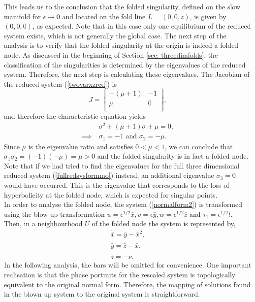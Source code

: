 This leads us to the conclusion that the folded singularity, defined on the slow manifold for $\epsilon \to 0$ and located on the fold line $L=(0,0,z)$, is given by $(0,0,0)$, as expected. Note that in this case only one equilibrium of the reduced system exists, which is not generally the global case.
The next step of the analysis is to verify that the folded singularity at the origin is indeed a folded node.
As discussed in the beginning of Section \ref{sec: threedimfolds}, the classification of the singularities is determined by the eigenvalues of the reduced system. Therefore, the next step is calculating these eigenvalues.
The Jacobian of the reduced system (\ref{twovarxzred}) is
\begin{equation}
J=\begin{bmatrix}
-(\mu +1) & -1 \\
\mu & 0 \\
\end{bmatrix},
\end{equation}
and therefore the characteristic equation yields
\begin{align*}
&\sigma^2 +(\mu +1)\sigma + \mu = 0, \\
\implies \ &\sigma_1= -1 \textrm{\ \ \ and \ \ \ } \sigma_2 = -\mu.
\end{align*}
Since $\mu$ is the eigenvalue ratio and satisfies $0< \mu < 1$, we can conclude that $ \sigma_1\sigma_2 = (-1)(-\mu)=\mu >0 $
and the folded singularity is in fact a folded node. Note that if we had tried to find the eigenvalues for the full three dimensional reduced system (\ref{fullredsysformmo}) instead, an additional eigenvalue $\sigma_3=0$ would have occurred. This is the eigenvalue that corresponds to the loss of hyperbolicity at the folded node, which is expected for singular points.\\

In order to analyse the folded node, the system (\ref{normalform2}) is transformed using the blow up transformation $u= \epsilon^{1/2}\bar{x}, v=\epsilon \bar{y}, w= \epsilon^{1/2} \bar{z}$ and $ \tau_1 = \epsilon^{1/2} \bar{t}$.
Then, in a neighbourhood $U$ of the folded node the system is represented by,
\begin{align*}
\dot{\bar{x}}= \bar{y} - \bar{x}^2,\\
\dot{\bar{y}}=\bar{z} - \bar{x}, \\
\dot{\bar{z}}= - \nu.
\end{align*}
In the following analysis, the bars will be omitted for convenience.
One important realisation is that the phase portraits for the rescaled system is topologically equivalent to the original normal form. Therefore, the mapping of solutions  found in the blown up system to the original system is straightforward.\\

